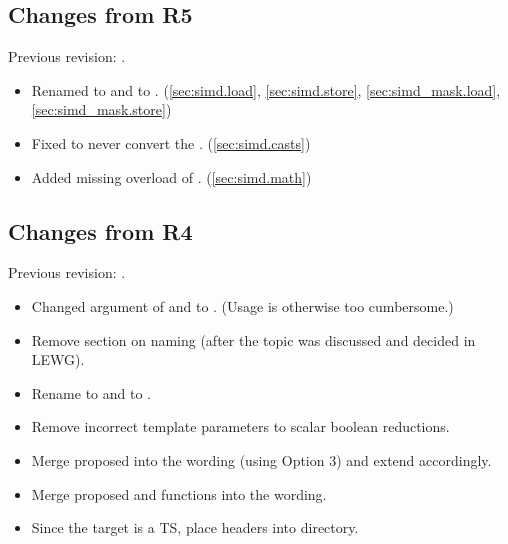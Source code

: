 \subsection{Changes from R5}
Previous revision: \parencite{P0214R5}.
\begin{itemize}
  \item Renamed  to  and  to . (\ref{sec:simd.load}, \ref{sec:simd.store}, \ref{sec:simd_mask.load}, \ref{sec:simd_mask.store})
  \item Fixed  to never convert the . (\ref{sec:simd.casts})
  \item Added missing  overload of . (\ref{sec:simd.math})
\end{itemize}

\subsection{Changes from R4}
Previous revision: \parencite{P0214R4}.
\begin{itemize}
  \item Changed  argument of  and  to .
    (Usage is otherwise too cumbersome.)
  \item Remove section on naming (after the topic was discussed and decided in LEWG).
  \item Rename  to  and  to .
  \item Remove incorrect template parameters to scalar boolean reductions.
  \item Merge proposed  into the wording (using Option 3) and extend  accordingly.
  \item Merge proposed  and  functions into the wording.
  \item Since the target is a TS, place headers into  directory.
\end{itemize}


